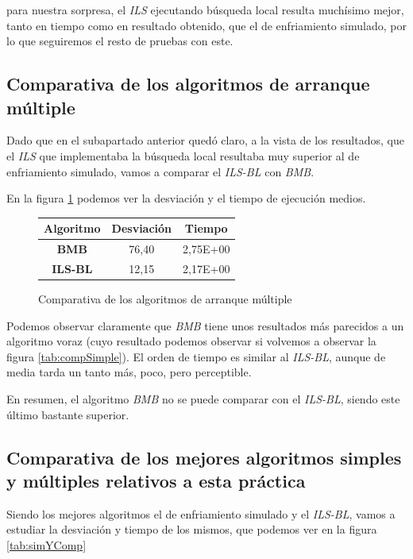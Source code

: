 para nuestra sorpresa, el \textit{ILS} ejecutando búsqueda local resulta muchísimo mejor, tanto en tiempo como en resultado obtenido, que el de enfriamiento simulado, por lo que seguiremos el resto de pruebas con este.

\subsection{Comparativa de los algoritmos de arranque múltiple}

Dado que en el subapartado anterior quedó claro, a la vista de los resultados, que el \textit{ILS} que implementaba la búsqueda local resultaba muy superior al de enfriamiento simulado, vamos a comparar el \textit{ILS-BL} con \textit{BMB}.

En la figura \ref{tab:compMult} podemos ver la desviación y el tiempo de ejecución medios.

\begin{figure}[H]
    \centering
    \begin{tabular}{|c|c|c|}
        \hline
        Algoritmo & \textbf{Desviación} & \textbf{Tiempo}\\
        \hline
        \textbf{BMB} & 76,40 & 2,75E+00\\
        \hline
        \textbf{ILS-BL} & 12,15 & 2,17E+00\\
        \hline
    \end{tabular}
    \caption{Comparativa de los algoritmos de arranque múltiple}
    \label{tab:compMult}
\end{figure}

Podemos observar claramente que \textit{BMB} tiene unos resultados más parecidos a un algoritmo voraz (cuyo resultado podemos observar si volvemos a observar la figura \ref{tab:compSimple}). El orden de tiempo es similar al \textit{ILS-BL}, aunque de media tarda un tanto más, poco, pero perceptible.

En resumen, el algoritmo \textit{BMB} no se puede comparar con el \textit{ILS-BL}, siendo este último bastante superior.

\subsection{Comparativa de los mejores algoritmos simples y múltiples relativos a esta práctica}

Siendo los mejores algoritmos el de enfriamiento simulado y el \textit{ILS-BL}, vamos a estudiar la desviación y tiempo de los mismos, que podemos ver en la figura \ref{tab:simYComp}

